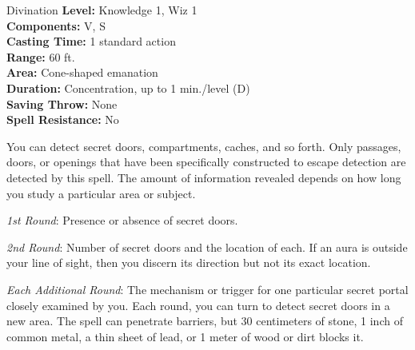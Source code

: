 {Divination}
{
	\textbf{Level:}
	Knowledge 1, Wiz 1\\
	\textbf{Components:}
	V, S\\
	\textbf{Casting Time:}
	1 standard action\\
	\textbf{Range:}
	60 ft.\\
	\textbf{Area:}
	Cone-shaped emanation\\
	\textbf{Duration:}
	Concentration, up to 1 min./level (D)\\
	\textbf{Saving Throw:}
	None\\
	\textbf{Spell Resistance:}
	No\\
}
{
	You can detect secret doors, compartments, caches, and so forth. Only passages, doors, or openings that have been specifically constructed to escape detection are detected by this spell. The amount of information revealed depends on how long you study a particular area or subject.

	\textit{1st Round}:
	Presence or absence of secret doors.

	\textit{2nd Round}:
	Number of secret doors and the location of each. If an aura is outside your line of sight, then you discern its direction but not its exact location.

	\textit{Each Additional Round}:
	The mechanism or trigger for one particular secret portal closely examined by you. Each round, you can turn to detect secret doors in a new area. The spell can penetrate barriers, but 30 centimeters of stone, 1 inch of common metal, a thin sheet of lead, or 1 meter of wood or dirt blocks it.

}
